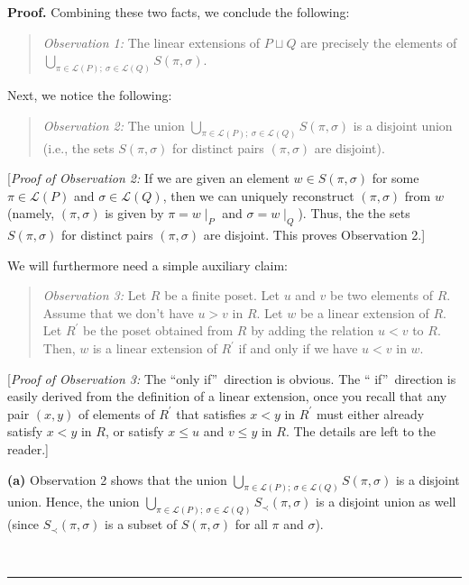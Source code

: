 \documentclass[numbers=enddot,12pt,final,onecolumn,notitlepage]{scrartcl}%
\theoremstyle{definition}
\newenvironment{statement}{\begin{quote}}{\end{quote}}
\newenvironment{proof}[1][Proof]{\noindent\textbf{#1.} }{\ \rule{0.5em}{0.5em}}
\newenvironment{verlong}{}{}
\begin{document}
\begin{verlong}
\begin{proof}
Combining these two facts, we conclude the following:

\begin{statement}
\textit{Observation 1:} The linear extensions of $P\sqcup Q$ are precisely the
elements of $\bigcup_{\pi\in\mathcal{L}\left(  P\right)  ;\ \sigma
\in\mathcal{L}\left(  Q\right)  }S\left(  \pi,\sigma\right)  $.
\end{statement}

Next, we notice the following:

\begin{statement}
\textit{Observation 2:} The union $\bigcup_{\pi\in\mathcal{L}\left(  P\right)
;\ \sigma\in\mathcal{L}\left(  Q\right)  }S\left(  \pi,\sigma\right)  $ is a
disjoint union (i.e., the sets $S\left(  \pi,\sigma\right)  $ for distinct
pairs $\left(  \pi,\sigma\right)  $ are disjoint).
\end{statement}

[\textit{Proof of Observation 2:} If we are given an element $w\in S\left(
\pi,\sigma\right)  $ for some $\pi\in\mathcal{L}\left(  P\right)  $ and
$\sigma\in\mathcal{L}\left(  Q\right)  $, then we can uniquely reconstruct
$\left(  \pi,\sigma\right)  $ from $w$ (namely, $\left(  \pi,\sigma\right)  $
is given by $\pi=w\mid_{P}$ and $\sigma=w\mid_{Q}$). Thus, the the sets
$S\left(  \pi,\sigma\right)  $ for distinct pairs $\left(  \pi,\sigma\right)
$ are disjoint. This proves Observation 2.]

We will furthermore need a simple auxiliary claim:

\begin{statement}
\textit{Observation 3:} Let $R$ be a finite poset. Let $u$ and $v$ be two
elements of $R$. Assume that we don't have $u>v$ in $R$. Let $w$ be a linear
extension of $R$. Let $R^{\prime}$ be the poset obtained from $R$ by adding
the relation $u<v$ to $R$. Then, $w$ is a linear extension of $R^{\prime}$ if
and only if we have $u<v$ in $w$.
\end{statement}

[\textit{Proof of Observation 3:} The \textquotedblleft only
if\textquotedblright\ direction is obvious. The \textquotedblleft
if\textquotedblright\ direction is easily derived from the definition of a
linear extension, once you recall that any pair $\left(  x,y\right)  $ of
elements of $R^{\prime}$ that satisfies $x<y$ in $R^{\prime}$ must either
already satisfy $x<y$ in $R$, or satisfy $x\leq u$ and $v\leq y$ in $R$. The
details are left to the reader.]

\textbf{(a)} Observation 2 shows that the union $\bigcup_{\pi\in
\mathcal{L}\left(  P\right)  ;\ \sigma\in\mathcal{L}\left(  Q\right)
}S\left(  \pi,\sigma\right)  $ is a disjoint union. Hence, the union
$\bigcup_{\pi\in\mathcal{L}\left(  P\right)  ;\ \sigma\in\mathcal{L}\left(
Q\right)  }S_{\prec}\left(  \pi,\sigma\right)  $ is a disjoint union as well
(since $S_{\prec}\left(  \pi,\sigma\right)  $ is a subset of $S\left(
\pi,\sigma\right)  $ for all $\pi$ and $\sigma$).


\end{proof}
\end{verlong}
\end{document}
